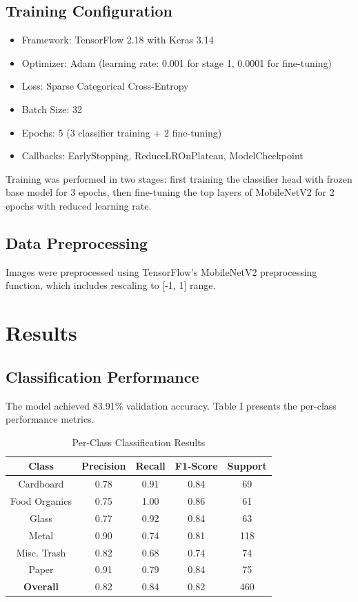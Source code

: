 \documentclass[conference]{IEEEtran}
\begin{document}
\subsection{Training Configuration}
\begin{itemize}
    \item Framework: TensorFlow 2.18 with Keras 3.14
    \item Optimizer: Adam (learning rate: 0.001 for stage 1, 0.0001 for fine-tuning)
    \item Loss: Sparse Categorical Cross-Entropy
    \item Batch Size: 32
    \item Epochs: 5 (3 classifier training + 2 fine-tuning)
    \item Callbacks: EarlyStopping, ReduceLROnPlateau, ModelCheckpoint
\end{itemize}

Training was performed in two stages: first training the classifier head with frozen base model for 3 epochs, then fine-tuning the top layers of MobileNetV2 for 2 epochs with reduced learning rate.

\subsection{Data Preprocessing}
Images were preprocessed using TensorFlow's MobileNetV2 preprocessing function, which includes rescaling to [-1, 1] range.

\section{Results}

\subsection{Classification Performance}
The model achieved 83.91\% validation accuracy. Table I presents the per-class performance metrics.

\begin{table}[htbp]
\caption{Per-Class Classification Results}
\begin{center}
\begin{tabular}{|c|c|c|c|c|}
\hline
\textbf{Class} & \textbf{Precision} & \textbf{Recall} & \textbf{F1-Score} & \textbf{Support}\\
\hline
Cardboard & 0.78 & 0.91 & 0.84 & 69\\
Food Organics & 0.75 & 1.00 & 0.86 & 61\\
Glass & 0.77 & 0.92 & 0.84 & 63\\
Metal & 0.90 & 0.74 & 0.81 & 118\\
Misc. Trash & 0.82 & 0.68 & 0.74 & 74\\
Paper & 0.91 & 0.79 & 0.84 & 75\\
\hline
\textbf{Overall} & 0.82 & 0.84 & 0.82 & 460\\
\hline
\end{tabular}
\end{center}
\end{table}
\end{document}
